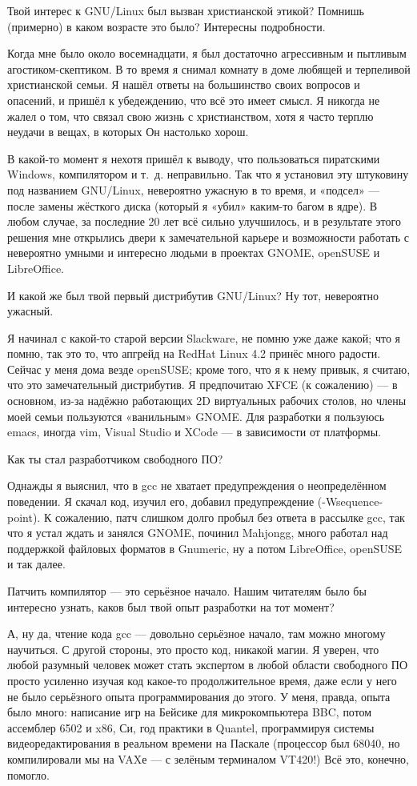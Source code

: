 \documentclass[10pt, a5paper]{article}
\begin{document}
\begin{Parallel}[p]{}{}
{\q Твой интерес к GNU/Linux был вызван христианской этикой? Помнишь (примерно) в каком возрасте это было? Интересны подробности.

\a Когда мне было около восемнадцати, я был достаточно агрессивным и пытливым агостиком-скептиком. В то время я снимал комнату в доме любящей и терпеливой христианской семьи. Я нашёл ответы на большинство своих вопросов и опасений, и пришёл к убедеждению, что всё это имеет смысл. Я никогда не жалел о том, что связал свою жизнь с христианством, хотя я часто терплю неудачи в вещах, в которых Он настолько хорош.

В какой-то момент я нехотя пришёл к выводу, что пользоваться пиратскими Windows, компилятором и т.~д. неправильно. Так что я установил эту штуковину под названием GNU/Linux, невероятно ужасную в то время, и «подсел» — после замены жёсткого диска (который я «убил» каким-то багом в ядре). В любом случае, за последние 20 лет всё сильно улучшилось, и в результате этого решения мне открылись двери к замечательной карьере и возможности работать с невероятно умными и интересно людьми в проектах GNOME, openSUSE и LibreOffice.

\q И какой же был твой первый дистрибутив GNU/Linux? Ну тот, невероятно ужасный.

\a Я начинал с какой-то старой версии Slackware, не помню уже даже какой; что я помню, так это то, что апгрейд на RedHat Linux 4.2 принёс много радости. Сейчас у меня дома везде openSUSE; кроме того, что я к нему привык, я считаю, что это замечательный дистрибутив. Я предпочитаю XFCE (к сожалению) — в основном, из-за надёжно работающих 2D виртуальных рабочих столов, но члены моей семьи пользуются «ванильным» GNOME. Для разработки я пользуюсь emacs, иногда vim, Visual Studio и XCode — в зависимости от платформы.

\q Как ты стал разработчиком свободного ПО?

\a Однажды я выяснил, что в gcc не хватает предупреждения о неопределённом поведении. Я скачал код, изучил его, добавил предупреждение (-Wsequence-point). К сожалению, патч слишком долго пробыл без ответа в рассылке gcc, так что я устал ждать и занялся GNOME, починил Mahjongg, много работал над поддержкой файловых форматов в Gnumeric, ну а потом LibreOffice, openSUSE и так далее.

\q Патчить компилятор — это серьёзное начало. Нашим читателям было бы интересно узнать, каков был твой опыт разработки на тот момент?

\a А, ну да, чтение кода gcc — довольно серьёзное начало, там можно многому научиться. С другой стороны, это просто код, никакой магии. Я уверен, что любой разумный человек может стать экспертом в любой области свободного ПО просто усиленно изучая код какое-то продолжительное время, даже если у него не было серьёзного опыта программирования до этого. У меня, правда, опыта было много: написание игр на Бейсике для микрокомпьютера BBC, потом ассемблер 6502 и x86, Си, год практики в Quantel, программируя системы видеоредактирования в реальном времени на Паскале (процессор был 68040, но компилировали мы на VAXе — с зелёным терминалом VT420!) Всё это, конечно, помогло.

}
\end{Parallel}
\end{document}
